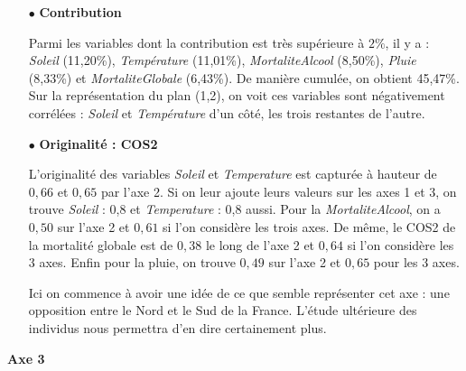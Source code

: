 \documentclass{article}
\begin{document}
\begin{itemize}
\item[$\bullet$] \textbf{Contribution}

Parmi les variables dont la contribution est très supérieure à $2\%$, il y a : \emph{Soleil} (11,20\%), \emph{Température} (11,01\%), \emph{MortaliteAlcool} (8,50\%), \emph{Pluie} (8,33\%) et \emph{MortaliteGlobale} (6,43\%). De manière cumulée, on obtient 45,47\%. Sur la représentation du plan (1,2), on voit ces variables sont négativement corrélées : \emph{Soleil} et \emph{Température} d'un côté, les trois restantes de l'autre.  

\item[$\bullet$] \textbf{Originalité : COS2}

L'originalité des variables \emph{Soleil} et \emph{Temperature} est capturée à hauteur de $0,66$ et $0,65$ par l'axe 2. Si on leur ajoute leurs valeurs sur les axes 1 et 3, on trouve \emph{Soleil} : 0,8 et \emph{Temperature} : 0,8 aussi. Pour la \emph{MortaliteAlcool}, on a $0,50$ sur l'axe 2 et $0,61$ si l'on considère les trois axes. De même, le COS2 de la mortalité globale est de $0,38$ le long de l'axe 2 et $0,64$ si l'on considère les 3 axes. Enfin pour la pluie, on trouve $0,49$ sur l'axe 2 et $0,65$ pour les 3 axes.

Ici on commence à avoir une idée de ce que semble représenter cet axe : une opposition entre le Nord et le Sud de la France. L'étude ultérieure des individus nous permettra d'en dire certainement plus.

\end{itemize} 

\bigskip

{\large \textbf{Axe 3}}
\end{document}
